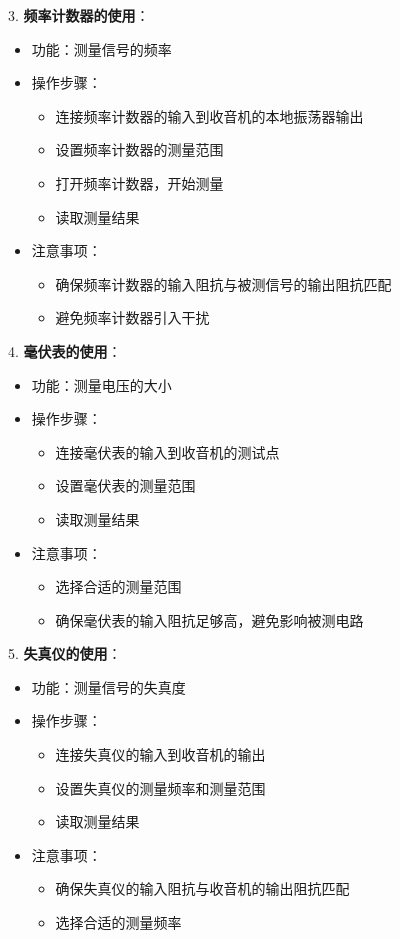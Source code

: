 \documentclass[12pt,UTF8]{ctexbook}
\begin{document}
3. \textbf{频率计数器的使用}：
   \begin{itemize}[leftmargin=3.5em]
   \item 功能：测量信号的频率
   \item 操作步骤：
     \begin{itemize}
     \item 连接频率计数器的输入到收音机的本地振荡器输出
     \item 设置频率计数器的测量范围
     \item 打开频率计数器，开始测量
     \item 读取测量结果
     \end{itemize}
   \item 注意事项：
     \begin{itemize}
     \item 确保频率计数器的输入阻抗与被测信号的输出阻抗匹配
     \item 避免频率计数器引入干扰
     \end{itemize}
   \end{itemize}

4. \textbf{毫伏表的使用}：
   \begin{itemize}[leftmargin=3.5em]
   \item 功能：测量电压的大小
   \item 操作步骤：
     \begin{itemize}
     \item 连接毫伏表的输入到收音机的测试点
     \item 设置毫伏表的测量范围
     \item 读取测量结果
     \end{itemize}
   \item 注意事项：
     \begin{itemize}
     \item 选择合适的测量范围
     \item 确保毫伏表的输入阻抗足够高，避免影响被测电路
     \end{itemize}
   \end{itemize}

5. \textbf{失真仪的使用}：
   \begin{itemize}[leftmargin=3.5em]
   \item 功能：测量信号的失真度
   \item 操作步骤：
     \begin{itemize}
     \item 连接失真仪的输入到收音机的输出
     \item 设置失真仪的测量频率和测量范围
     \item 读取测量结果
     \end{itemize}
   \item 注意事项：
     \begin{itemize}
     \item 确保失真仪的输入阻抗与收音机的输出阻抗匹配
     \item 选择合适的测量频率
     \end{itemize}
   \end{itemize}
\end{document}
